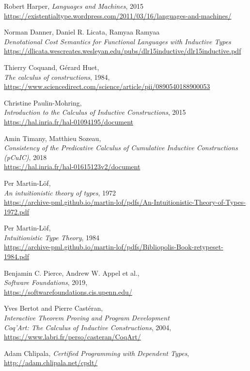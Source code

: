 \documentclass[declaration,mgr,english,shortabstract]{iithesis}
\begin{document}
\begin{thebibliography}{1}
    Robert Harper, \textit{Languages and Machines}, 2015 \\
    \url{https://existentialtype.wordpress.com/2011/03/16/languages-and-machines/}

    Norman Danner, Daniel R. Licata, Ramyaa Ramyaa \\
    \textit{Denotational Cost Semantics for
    Functional Languages with Inductive Types} \\
    \url{https://dlicata.wescreates.wesleyan.edu/pubs/dlr15inductive/dlr15inductive.pdf}

    Thierry Coquand, Gérard Huet, \\
    \textit{The calculus of constructions}, 1984, \\
    \url{https://www.sciencedirect.com/science/article/pii/0890540188900053}

    Christine Paulin-Mohring, \\
    \textit{Introduction to the Calculus of Inductive Constructions}, 2015 \\
    \url{https://hal.inria.fr/hal-01094195/document}

    Amin Timany, Matthieu Sozeau, \\
    \textit{Consistency of the Predicative Calculus of Cumulative
    Inductive Constructions (pCuIC)}, 2018 \\
    \url{https://hal.inria.fr/hal-01615123v2/document}

    Per Martin-L\"{o}f, \\
    \textit{An intuitionistic theory of types}, 1972 \\
    \url{https://archive-pml.github.io/martin-lof/pdfs/An-Intuitionistic-Theory-of-Types-1972.pdf}

    Per Martin-L\"{o}f, \\
    \textit{Intuitionistic Type Theory}, 1984 \\
    \url{https://archive-pml.github.io/martin-lof/pdfs/Bibliopolis-Book-retypeset-1984.pdf}

    Benjamin C. Pierce, Andrew W. Appel et al., \\
    \textit{Software Foundations}, 2019, \\
    \url{https://softwarefoundations.cis.upenn.edu/}

    Yves Bertot and Pierre Castéran, \\
    \textit{Interactive Theorem Proving and Program Development \\ Coq'Art: The Calculus of Inductive Constructions}, 2004, \\
    \url{https://www.labri.fr/perso/casteran/CoqArt/}

    Adam Chlipala,
    \textit{Certified Programming with Dependent Types}, \\
    \url{http://adam.chlipala.net/cpdt/}

\end{thebibliography}
\end{document}
